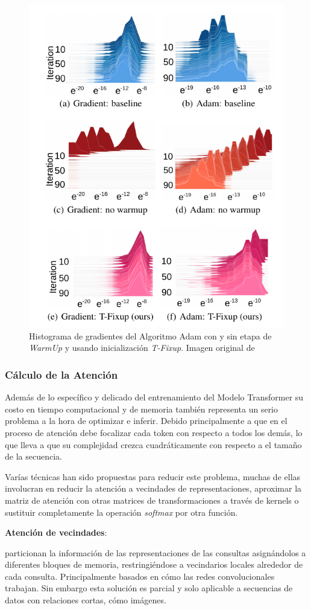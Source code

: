 \begin{figure}[ht!]
    \centering
    \includegraphics[width=0.5 \textwidth]{Chapters/2. Transformer/Figures/transformer/tfixup.png}
    \caption{Histograma de gradientes del Algoritmo Adam con y sin etapa de \textit{WarmUp} y
    usando inicialización \textit{T-Fixup}. Imagen original de \citeauthor{pmlr-v119-huang20f}}
    \label{fig:t-fixup}
\end{figure}

\subsubsection{Cálculo de la Atención}

Además de lo específico y delicado del entrenamiento del Modelo Transformer su costo en tiempo
computacional y de memoria también representa un serio problema a la hora de optimizar e inferir.
Debido principalmente a que en el proceso de atención debe focalizar cada token con respecto a todos
los demás, lo que lleva a que su complejidad crezca cuadráticamente con respecto a el tamaño de la
secuencia.

Varías técnicas han sido propuestas para reducir este problema, muchas de ellas involucran en reducir
la atención a vecindades de representaciones, aproximar la matriz de atención con otras matrices de
transformaciones a través de kernels o sustituir completamente la operación \textit{softmax}
por otra función.

\textbf{Atención de vecindades}:

\citeauthor{DBLP:journals/corr/abs-1802-05751} particionan la información de las representaciones de
las consultas asignándolos a diferentes bloques de memoria, restringiéndose a vecindarios locales
alrededor de cada consulta. Principalmente basados en cómo las redes convolucionales trabajan. Sin
embargo esta solución es parcial y solo aplicable a secuencias de datos con relaciones cortas, cómo
imágenes.

